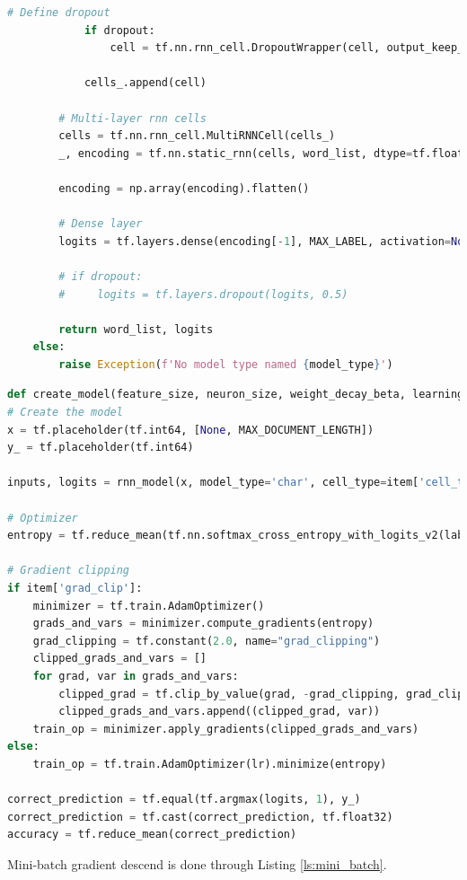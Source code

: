 \begin{lstlisting}[language=Python, caption= Character and word recurrent neural network neural network (layers controlled by layers parameter), label=ls:2_rnn]
            # Define dropout
            if dropout:
                cell = tf.nn.rnn_cell.DropoutWrapper(cell, output_keep_prob=0.5)

            cells_.append(cell)

        # Multi-layer rnn cells
        cells = tf.nn.rnn_cell.MultiRNNCell(cells_)
        _, encoding = tf.nn.static_rnn(cells, word_list, dtype=tf.float32)

        encoding = np.array(encoding).flatten()

        # Dense layer
        logits = tf.layers.dense(encoding[-1], MAX_LABEL, activation=None)

        # if dropout:
        #     logits = tf.layers.dropout(logits, 0.5)

        return word_list, logits
    else:
        raise Exception(f'No model type named {model_type}')
\end{lstlisting}

\begin{lstlisting}[language=Python, caption= loss and accuracy functions, label=ls:2_cost]
def create_model(feature_size, neuron_size, weight_decay_beta, learning_rate, layers=3, dropout=False):
# Create the model
x = tf.placeholder(tf.int64, [None, MAX_DOCUMENT_LENGTH])
y_ = tf.placeholder(tf.int64)

inputs, logits = rnn_model(x, model_type='char', cell_type=item['cell_type'], num_layers=item['num_layers'])

# Optimizer
entropy = tf.reduce_mean(tf.nn.softmax_cross_entropy_with_logits_v2(labels=tf.one_hot(y_, MAX_LABEL), logits=logits))

# Gradient clipping
if item['grad_clip']:
    minimizer = tf.train.AdamOptimizer()
    grads_and_vars = minimizer.compute_gradients(entropy)
    grad_clipping = tf.constant(2.0, name="grad_clipping")
    clipped_grads_and_vars = []
    for grad, var in grads_and_vars:
        clipped_grad = tf.clip_by_value(grad, -grad_clipping, grad_clipping)
        clipped_grads_and_vars.append((clipped_grad, var))
    train_op = minimizer.apply_gradients(clipped_grads_and_vars)
else:
    train_op = tf.train.AdamOptimizer(lr).minimize(entropy)

correct_prediction = tf.equal(tf.argmax(logits, 1), y_)
correct_prediction = tf.cast(correct_prediction, tf.float32)
accuracy = tf.reduce_mean(correct_prediction)
\end{lstlisting}

Mini-batch gradient descend is done through Listing \ref{ls:mini_batch}.

